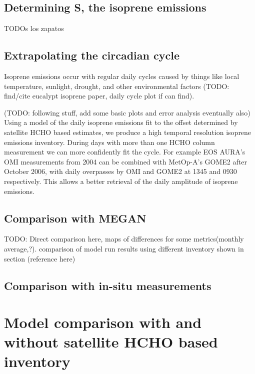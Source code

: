   \subsection{Determining S, the isoprene emissions}
    TODOs los zapatos
    
  \subsection{Extrapolating the circadian cycle}
    Isoprene emissions occur with regular daily cycles caused by things like local temperature, sunlight, drought, and other environmental factors (TODO: find/cite eucalypt isoprene paper, daily cycle plot if can find).
    
    (TODO: following stuff, add some basic plots and error analysis eventually also)
    Using a model of the daily isoprene emissions fit to the offset determined by satellite HCHO based estimates, we produce a high temporal resolution isoprene emissions inventory.
    During days with more than one HCHO column measurement we can more confidently fit the cycle. 
    For example EOS AURA's OMI measurements from 2004 can be combined with MetOp-A's GOME2 after October 2006, with daily overpasses by OMI and GOME2 at 1345 and 0930 respectively.
    This allows a better retrieval of the daily amplitude of isoprene emissions.
    
  \subsection{Comparison with MEGAN}
    TODO: Direct comparison here, maps of differences for some metrics(monthly average,?). comparison of model run results using different inventory shown in section (reference here)
    
  \subsection{Comparison with in-situ measurements}
    
\section{Model comparison with and without satellite HCHO based inventory}


